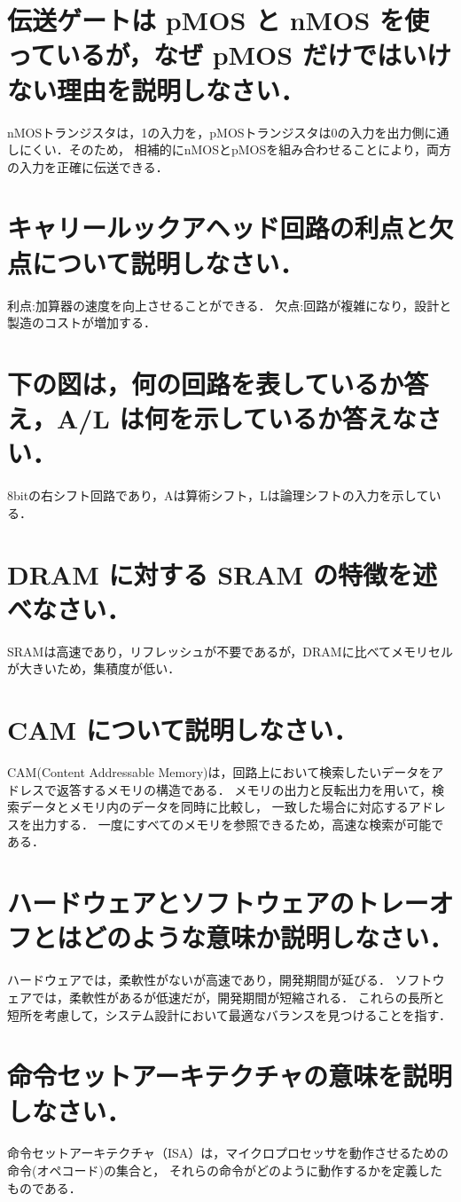 \documentclass[a4paper,11pt]{ltjsarticle}
\begin{document}
\section{伝送ゲートは pMOS と nMOS を使っているが，なぜ pMOS だけではいけない理由を説明しなさい．}
nMOSトランジスタは，1の入力を，pMOSトランジスタは0の入力を出力側に通しにくい．そのため，
相補的にnMOSとpMOSを組み合わせることにより，両方の入力を正確に伝送できる．
\section{キャリールックアヘッド回路の利点と⽋点について説明しなさい．}
利点:加算器の速度を向上させることができる．
欠点:回路が複雑になり，設計と製造のコストが増加する．
\section{下の図は，何の回路を表しているか答え，A/L は何を⽰しているか答えなさい．}
8bitの右シフト回路であり，Aは算術シフト，Lは論理シフトの入力を示している．
\section{DRAM に対する SRAM の特徴を述べなさい．}
SRAMは高速であり，リフレッシュが不要であるが，DRAMに比べてメモリセルが大きいため，集積度が低い．
\section{ CAM について説明しなさい．}
CAM(Content Addressable Memory)は，回路上において検索したいデータをアドレスで返答するメモリの構造である．
メモリの出力と反転出力を用いて，検索データとメモリ内のデータを同時に比較し，
一致した場合に対応するアドレスを出力する．
一度にすべてのメモリを参照できるため，高速な検索が可能である．
\section{ハードウェアとソフトウェアのトレーオフとはどのような意味か説明しなさい．}
ハードウェアでは，柔軟性がないが高速であり，開発期間が延びる．
ソフトウェアでは，柔軟性があるが低速だが，開発期間が短縮される．
これらの長所と短所を考慮して，システム設計において最適なバランスを見つけることを指す．
\section{命令セットアーキテクチャの意味を説明しなさい．}
命令セットアーキテクチャ（ISA）は，マイクロプロセッサを動作させるための命令(オペコード)の集合と，
それらの命令がどのように動作するかを定義したものである．
\end{document}

